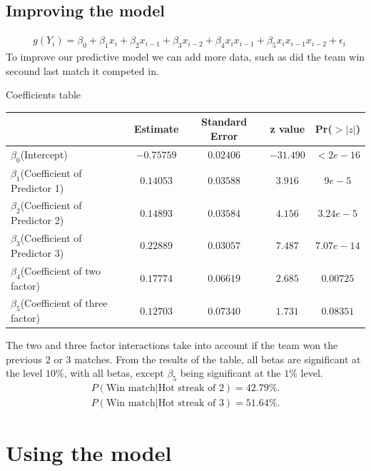 \documentclass{article}
\begin{document}
\subsection{Improving the model}
\begin{align*}
    &g(Y_i)=\beta_0+\beta_1x_i+\beta_2x_{i-1}+\beta_3x_{i-2}+\beta_4x_ix_{i-1}+\beta_5x_ix_{i-1}x_{i-2}+\epsilon_i
\end{align*}
To improve our predictive model we can add more data, such as did the team win secound last match it competed in.
\begin{center}
Coefficients table \newline
\begin{tabular}{lcccc}
\hline
    &Estimate&Standard Error&z value&Pr($>|z|$)\\
\hline
    $\beta_0$(Intercept)&$-0.75759$&$0.02406$&$-31.490$&$<2e-16$\\ 
    $\beta_1$(Coefficient of Predictor 1)&$ 0.14053$&$0.03588$&$3.916$&$9e-5$\\ 
    $\beta_2$(Coefficient of Predictor 2)&$0.14893$&$0.03584$&$4.156$&$3.24e-5$\\ 
    $\beta_3$(Coefficient of Predictor 3)&$0.22889$&$0.03057$&$7.487$&$7.07e-14$\\ 
    $\beta_4$(Coefficient of two factor)&$0.17774$&$0.06619$&$2.685$&$0.00725$\\ 
    $\beta_5$(Coefficient of three factor)&$0.12703$&$0.07340$&$1.731$&$0.08351$\\ 
\hline
\end{tabular}
\end{center}
The two and three factor interactions take into account if the team won the previous 2 or 3 matches. From the results of the table, all betas are significant at the level $10\%$, with all betas, except $\beta_5$ being significant at the $1\%$ level.
\begin{align*}
    P(\text{Win match}|\text{Hot streak of 2})=42.79\%.\\
    P(\text{Win match}|\text{Hot streak of 3})=51.64\%.
\end{align*}
\section{Using the model}\label{sec:model}
\end{document}

